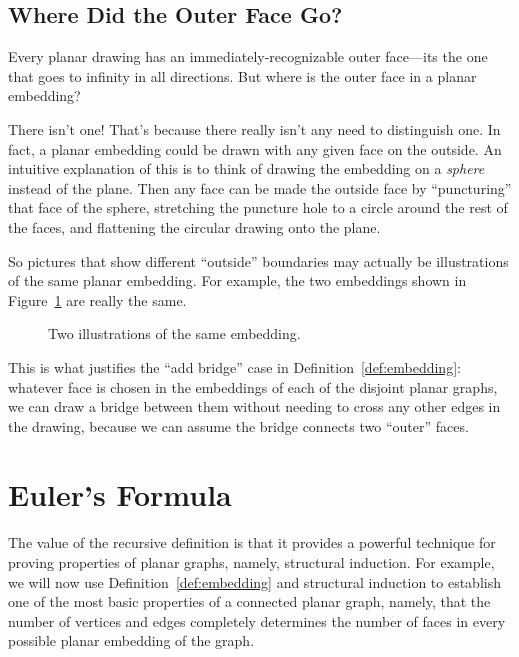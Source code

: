 \subsection{Where Did the Outer Face Go?}

Every planar drawing has an immediately-recognizable outer face---its
the one that goes to infinity in all directions.  But where is the
outer face in a planar embedding?

There isn't one!  That's because there really isn't any need to
distinguish one.  In fact, a planar embedding could be drawn with any
given face on the outside.  An intuitive explanation of this is to
think of drawing the embedding on a \emph{sphere} instead of the
plane.  Then any face can be made the outside face by ``puncturing''
that face of the sphere, stretching the puncture hole to a circle
around the rest of the faces, and flattening the circular drawing onto
the plane.

So pictures that show different ``outside'' boundaries may actually be
illustrations of the same planar embedding.  For example, the two
embeddings shown in Figure~\ref{fig:5DE} are really the same.

\begin{figure}


\caption{Two illustrations of the same embedding.}
\label{fig:5DE}
\end{figure}

This is what justifies the ``add bridge'' case in
Definition~\ref{def:embedding}: whatever face is chosen in the
embeddings of each of the disjoint planar graphs, we can draw a
bridge between them without needing to cross any other edges in the
drawing, because we can assume the bridge connects two ``outer''
faces.

\begin{problems}
\practiceproblems
{}

\end{problems}


\section{Euler's Formula}

The value of the recursive definition is that it provides a powerful
technique for proving properties of planar graphs, namely, structural
induction.  For example, we will now use
Definition~\ref{def:embedding} and structural induction to establish
one of the most basic properties of a connected planar graph, namely,
that the number of vertices and edges completely determines the number
of faces in every possible planar embedding of the graph.

